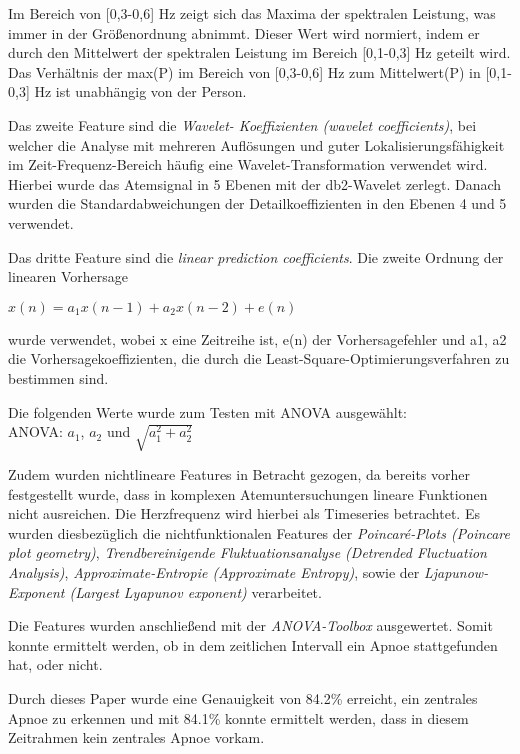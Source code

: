 Im Bereich von [0,3-0,6] Hz zeigt sich das Maxima der spektralen Leistung, was immer in der Größenordnung abnimmt. 
Dieser Wert wird normiert, indem er durch den Mittelwert der spektralen Leistung im Bereich [0,1-0,3] Hz geteilt wird. 
Das Verhältnis der max(P) im Bereich von [0,3-0,6] Hz zum Mittelwert(P) in [0,1-0,3] Hz ist unabhängig von der Person.

Das zweite Feature sind die \textit{Wavelet- Koeffizienten (wavelet coefficients)}, bei welcher die Analyse mit mehreren Auflösungen und guter Lokalisierungsfähigkeit im Zeit-Frequenz-Bereich häufig eine Wavelet-Transformation verwendet wird. 
Hierbei wurde das Atemsignal in 5 Ebenen mit der db2-Wavelet zerlegt. Danach wurden die Standardabweichungen der Detailkoeffizienten in den Ebenen 4 und 5 verwendet. 

Das dritte Feature sind die \textit{linear prediction coefficients}. 
Die zweite Ordnung der linearen Vorhersage
\begin{center}
    $x(n) = a_1 x(n-1) + a_2 x(n-2) + e(n)$
\end{center} 
wurde verwendet, wobei x eine Zeitreihe ist, e(n) der Vorhersagefehler und {a1, a2} die Vorhersagekoeffizienten, die durch die Least-Square-Optimierungsverfahren zu bestimmen sind.

Die folgenden Werte wurde zum Testen mit ANOVA ausgewählt: \\
ANOVA: $a_1$, $a_2$ und $\sqrt{a_1^{2} + a_2^{2}}$


Zudem wurden nichtlineare Features in Betracht gezogen, da bereits vorher festgestellt wurde, dass in komplexen Atemuntersuchungen lineare Funktionen nicht ausreichen. Die Herzfrequenz wird hierbei als Timeseries betrachtet.
Es wurden diesbezüglich die nichtfunktionalen Features der \textit{Poincaré-Plots (Poincare plot geometry)}, \textit{Trendbereinigende Fluktuationsanalyse (Detrended Fluctuation Analysis)}, \textit{Approximate-Entropie (Approximate Entropy)}, sowie der \textit{Ljapunow-Exponent (Largest Lyapunov exponent)} verarbeitet. 

Die Features wurden anschließend mit der \textit{ANOVA-Toolbox} ausgewertet.
Somit konnte ermittelt werden, ob in dem zeitlichen Intervall ein Apnoe stattgefunden hat, oder nicht.

Durch dieses Paper wurde eine Genauigkeit von 84.2\% erreicht, ein zentrales Apnoe zu erkennen und mit 84.1\% konnte ermittelt werden, dass in diesem Zeitrahmen kein zentrales Apnoe vorkam.


